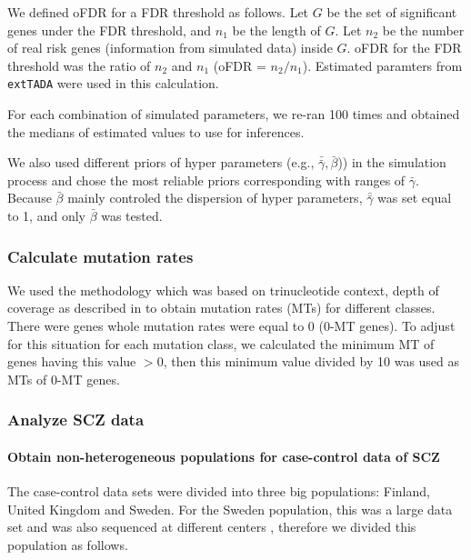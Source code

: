 \documentclass[]{article}
\begin{document}
We defined oFDR for a FDR threshold as
follows. Let $G$ be the set of significant genes under the FDR
threshold, and $n_1$ be the length of $G$. Let $n_2$ be the number of real risk genes (information
from simulated data) inside $G$. oFDR for the FDR threshold was the
ratio of $n_2$ and $n_1$ (oFDR = $n_2/n_1$). Estimated paramters from
\texttt{extTADA} were used in this calculation.

For each combination of simulated parameters, we re-ran 100 times and obtained the medians of
estimated values to use for inferences.

We also used different priors of hyper parameters (e.g., $\bar{\bar{\gamma}},  \bar{\beta}$)) in the simulation process and chose the most reliable
priors corresponding with ranges of $\bar{\gamma}$. Because
$\bar{\beta}$ mainly controled the dispersion of hyper parameters, $\bar{\bar{\gamma}}$ was set equal to 1, and only $\bar{\beta}$ was
tested.


\subsubsection{Calculate mutation rates}

We used the methodology which was based on trinucleotide context,
depth of coverage as described in \cite{fromer2014novo} to obtain
mutation rates (MTs) for different classes. There were genes whole mutation
rates were equal to 0 (0-MT genes). To adjust for this situation for each mutation
class, we calculated the minimum MT of genes having this
value $> 0$, then this minimum value divided by 10 was used as MTs of 0-MT genes.

\subsubsection{Analyze SCZ data}

\paragraph{Obtain non-heterogeneous populations for case-control data
  of SCZ}

The case-control data sets were divided into three big populations:
Finland, United Kingdom and Sweden. For the Sweden population, this
was a large data set and was also sequenced at different centers
\citep{genovese2016increased}, therefore we divided this population as follows.
\end{document}
